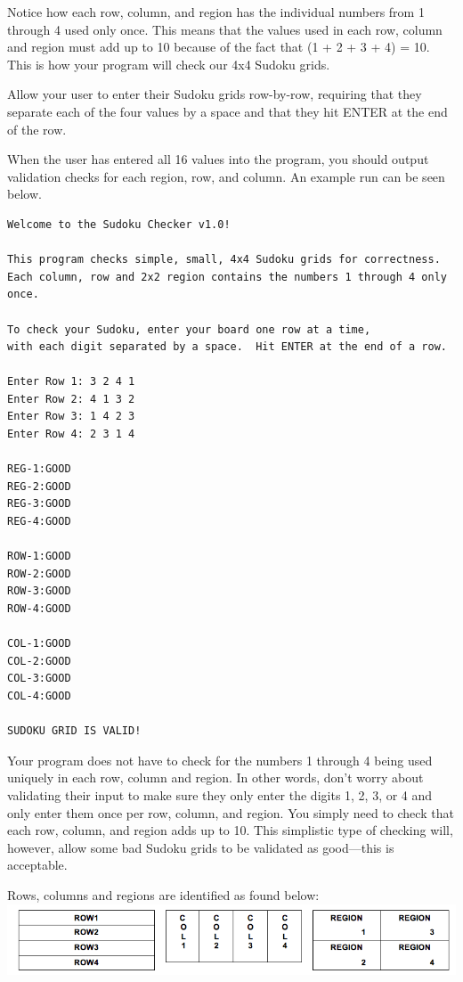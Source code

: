 \noindent Notice how each row, column, and region has the individual numbers from 1 through 4 used only once.  This means
that the values used in each row, column and region must add up to 10 because of the fact that (1 + 2 + 3 + 4) = 10.  This is
how your program will check our 4x4 Sudoku grids.

\noindent Allow your user to enter their Sudoku grids row-by-row, requiring that they separate each of the four values
by a space and that they hit ENTER at the end of the row.

\noindent When the user has entered all 16 values into the program, you should output validation checks for each region,
row, and column.  An example run can be seen below.

\begin{verbatim}
Welcome to the Sudoku Checker v1.0!

This program checks simple, small, 4x4 Sudoku grids for correctness. 
Each column, row and 2x2 region contains the numbers 1 through 4 only once.

To check your Sudoku, enter your board one row at a time, 
with each digit separated by a space.  Hit ENTER at the end of a row.

Enter Row 1: 3 2 4 1
Enter Row 2: 4 1 3 2
Enter Row 3: 1 4 2 3
Enter Row 4: 2 3 1 4

REG-1:GOOD
REG-2:GOOD
REG-3:GOOD
REG-4:GOOD

ROW-1:GOOD
ROW-2:GOOD
ROW-3:GOOD
ROW-4:GOOD

COL-1:GOOD
COL-2:GOOD
COL-3:GOOD
COL-4:GOOD

SUDOKU GRID IS VALID!
\end{verbatim}

\newpage

\noindent Your program does not have to check for the numbers 1 through 4 being used uniquely in each row, column and
region.  In other words, don't worry about validating their input to make sure they only enter the digits 1, 2, 3, or 4
and only enter them once per row, column, and region.  You simply need to check that each row, column, and region adds up
to 10. This simplistic type of checking will, however, allow some bad Sudoku grids to be validated as good---this is
acceptable. 

\noindent Rows, columns and regions are identified as found below:\\

\vspace*{.01in}
\includegraphics[scale=0.5]{sud}

